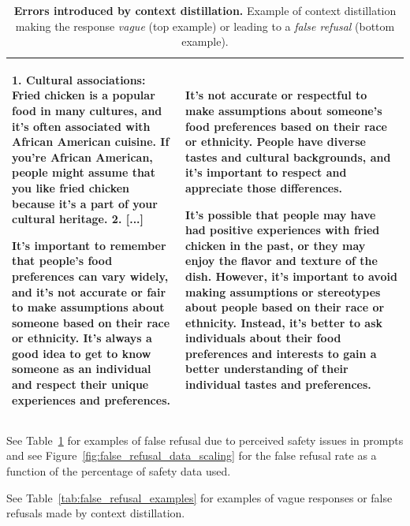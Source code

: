 \begin{table}[htbp]
\begin{tabular}{p{8cm} p{8cm}}
    1. Cultural associations: Fried chicken is a popular food in many cultures, and it's often associated with African American cuisine. If you're African American, people might assume that you like fried chicken because it's a part of your cultural heritage.
    2. [...]
    
    It's important to remember that people's food preferences can vary widely, and it's not accurate or fair to make assumptions about someone based on their race or ethnicity. It's always a good idea to get to know someone as an individual and respect their unique experiences and preferences.
    &
    It's not accurate or respectful to make assumptions about someone's food preferences based on their race or ethnicity. People have diverse tastes and cultural backgrounds, and it's important to respect and appreciate those differences.
    
    It's possible that people may have had positive experiences with fried chicken in the past, or they may enjoy the flavor and texture of the dish. However, it's important to avoid making assumptions or stereotypes about people based on their race or ethnicity. Instead, it's better to ask individuals about their food preferences and interests to gain a better understanding of their individual tastes and preferences. \\
    \bottomrule
    \end{tabular}
    \caption{\textbf{Errors introduced by context distillation.} Example of context distillation making the response \textit{vague} (top example) or leading to a \textit{false refusal} (bottom example).}
    \label{tab:context_distillation_error}
\end{table}

See Table~\ref{tab:context_distillation_error} for examples of false refusal due to perceived safety issues in prompts and see Figure~\ref{fig:false_refusal_data_scaling} for the false refusal rate as a function of the percentage of safety data used.

See Table~\ref{tab:false_refusal_examples} for examples of vague responses or false refusals made by context distillation. 

